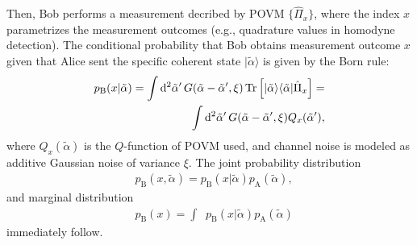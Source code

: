 \documentclass[%
reprint,
superscriptaddress,
 amsmath,amssymb,amsfonts,
 aps,
 pra,
 longbibliography
]{revtex4-2}
\newcommand{\ket}[1]{\ensuremath{|{#1}\rangle}}
\newcommand{\bra}[1]{\ensuremath{\langle{#1}|}}
\newcommand{\Tr}{\mathop{\rm Tr}\nolimits}
\newcommand{\ind}[1]{\mathrm{#1}}
\newcommand{\dd}{\mathrm{d}}
\begin{document}
Then, Bob performs a measurement decribed by POVM $\{\hat{\Pi}_x\}$, where the index $x$ parametrizes the measurement outcomes (e.g., quadrature values in homodyne detection). The conditional probability that Bob obtains measurement outcome $x$ given that Alice sent the specific coherent state $\ket{\tilde\alpha}$ is given by the Born rule:
\begin{align}
\label{eq:pB(x|A)}
    p_{\ind{B}}(x|\tilde\alpha) = \int \mathop{\dd^2\tilde\alpha'}
G(\tilde\alpha-\tilde\alpha', \xi) \Tr \left[ \ket{{\tilde\alpha}}\bra{{\tilde\alpha}}\hat{\Pi}_x \right]= \notag \\\int \mathop{\dd^2\tilde\alpha'}
G(\tilde\alpha-\tilde\alpha', \xi) Q_x(\tilde \alpha'),
\end{align}
where $Q_x(\tilde \alpha)$ is the $Q$-function of POVM used, and channel noise is modeled as additive Gaussian noise of variance $\xi$. 
The joint probability distribution
\begin{align}
\label{eq:pBxa}
    &p_{\ind{B}}(x,\tilde \alpha)=p_{\ind{B}}(x|\tilde \alpha)
    p_{\ind{A}}(\tilde \alpha),
\end{align}
and marginal distribution
\begin{align}
\label{eq:pBx}
    &p_{\ind{B}}(x)=\int \mathop{\dd^2\tilde \alpha} p_{\ind{B}}(x|\tilde \alpha)
    p_{\ind{A}}(\tilde \alpha)\end{align}
immediately follow.
\end{document}
